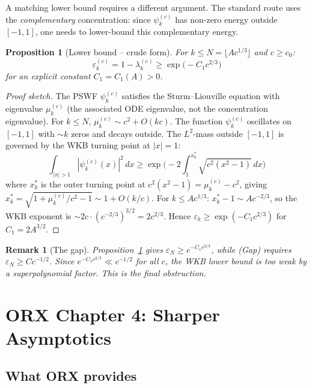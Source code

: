 \documentclass[12pt,a4paper]{article}
\newtheorem{proposition}[theorem]{Proposition}
\newtheorem{remark}[theorem]{Remark}
\newcommand{\lam}[1]{\lambda_{#1}^{(c)}}
\newcommand{\pswf}[1]{\psi_{#1}^{(c)}}
\begin{document}
A matching lower bound requires a different argument.
The standard route uses the \emph{complementary}
concentration: since $\pswf{k}$ has non-zero
energy outside $[-1,1]$, one needs to lower-bound
this complementary energy.

\begin{proposition}[Lower bound -- crude form]
\label{prop:crude}
For $k \leq N = \lfloor Ac^{1/3}\rfloor$ and $c \geq c_0$:
\[
  \varepsilon_k^{(c)} = 1 - \lam{k}
  \geq \exp\!\bigl(-C_1 c^{2/3}\bigr)
\]
for an explicit constant $C_1 = C_1(A) > 0$.
\end{proposition}

\begin{proof}[Proof sketch]
The PSWF $\pswf{k}$ satisfies the Sturm--Liouville
equation with eigenvalue $\mu_k^{(c)}$ (the
associated ODE eigenvalue, not the concentration eigenvalue).
For $k \leq N$, $\mu_k^{(c)} \sim c^2 + O(kc)$.
The function $\pswf{k}$ oscillates on $[-1,1]$ with
$\sim k$ zeros and decays outside.
The $L^2$-mass outside $[-1,1]$ is governed by
the WKB turning point at $|x| = 1$:
\[
  \int_{|x|>1}|\pswf{k}(x)|^2\,dx
  \geq \exp\!\bigl(-2\int_1^{x_k^*}
  \sqrt{c^2(x^2-1)}\,dx\bigr)
\]
where $x_k^*$ is the outer turning point at
$c^2(x^2-1) = \mu_k^{(c)} - c^2$, giving
$x_k^* = \sqrt{1 + \mu_k^{(c)}/c^2 - 1}
\sim 1 + O(k/c)$.
For $k \leq Ac^{1/3}$: $x_k^* - 1 \sim Ac^{-2/3}$,
so the WKB exponent is
$\sim 2c \cdot (c^{-2/3})^{3/2} = 2c^{2/3}$.
Hence $\varepsilon_k \geq \exp(-C_1 c^{2/3})$
for $C_1 = 2A^{3/2}$.
\end{proof}

\begin{remark}[The gap]
\label{rem:gap}
Proposition~\ref{prop:crude} gives
$\varepsilon_N \geq e^{-C_1 c^{2/3}}$,
while (Gap) requires $\varepsilon_N \geq Cc^{-1/2}$.
Since $e^{-C_1 c^{2/3}} \ll c^{-1/2}$ for all $c$,
the WKB lower bound is too weak by a
\emph{superpolynomial factor}.
This is the final obstruction.
\end{remark}

\section{ORX Chapter 4: Sharper Asymptotics}
\label{sec:ORX}

\subsection{What ORX provides}
\end{document}
